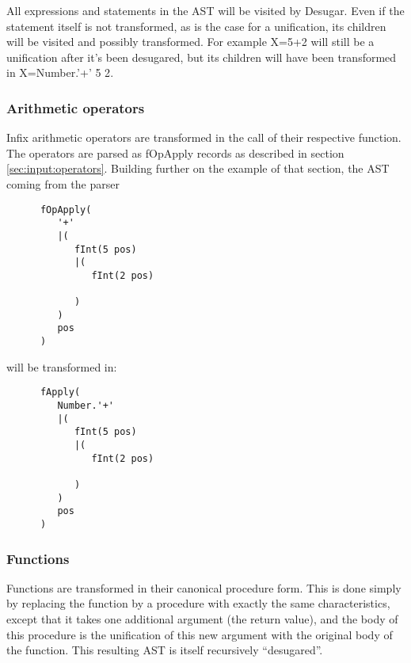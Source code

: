 \documentclass[a4paper]{memoir}
\begin{document}
All expressions and statements in the AST will be visited by Desugar. Even if the statement itself is not transformed, as is the case for a unification, its children will be visited and possibly transformed. For example
X=5+2 will still be a unification after it's been desugared, but its children will have been transformed in X={Number.'+' 5 2}.



\subsubsection{Arithmetic operators}
Infix arithmetic operators are transformed in the call of their respective function.
The operators are parsed as fOpApply records as described in section \ref{sec:input:operators}. Building further on the example of that section, the AST coming from the parser

\begin{verbatim}
      fOpApply(
         '+'
         |(
            fInt(5 pos)
            |(
               fInt(2 pos)
               
            )
         )
         pos
      )
\end{verbatim}
will be transformed in:
\begin{verbatim}
      fApply(
         Number.'+'
         |(
            fInt(5 pos)
            |(
               fInt(2 pos)
               
            )
         )
         pos
      )
\end{verbatim}

\subsubsection{Functions}\label{sec:arch:desugar:functions}
Functions are transformed in their canonical procedure form. This is done simply by replacing the function by a procedure with exactly the same characteristics, except that it takes one additional argument (the return value), and the body of this procedure is the unification of this new argument with the original body of the function. This resulting AST is itself recursively ``desugared''.
\end{document}
